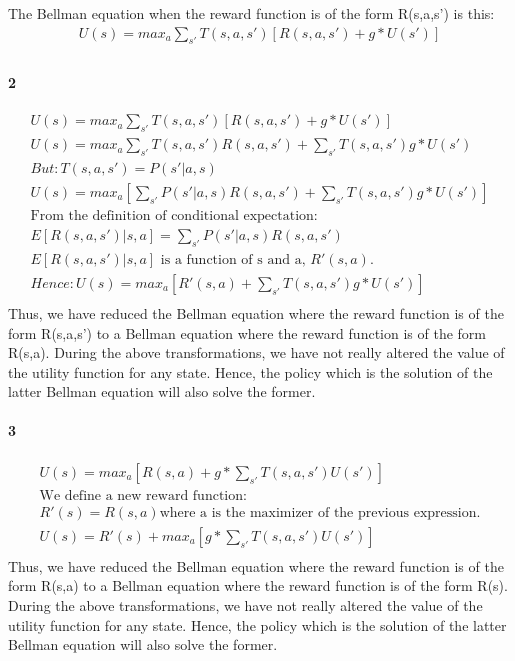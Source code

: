 \documentclass[10pt]{article}
\begin{document}
The Bellman equation when the reward function is of the form R(s,a,s') is this:
\begin{eqnarray}
U(s)=max_{a}\sum_{s'}T(s,a,s')[R(s,a,s') + g*U(s')]\\
\end{eqnarray}

\paragraph{2}
\begin{eqnarray}
U(s)=max_{a}\sum_{s'}T(s,a,s')[R(s,a,s') + g*U(s')]\\
U(s)=max_{a}\sum_{s'}T(s,a,s')R(s,a,s') + \sum_{s'}T(s,a,s')g*U(s')\\
But:T(s,a,s')=P(s'|a,s)\\
U(s)=max_{a}[\sum_{s'}P(s'|a,s)R(s,a,s') + \sum_{s'}T(s,a,s')g*U(s')]\\
\text{From the definition of conditional expectation: }\\
E[R(s,a,s')|s,a]=\sum_{s'}P(s'|a,s)R(s,a,s')\\
E[R(s,a,s')|s,a]\text{ is a function of s and a, } R'(s,a).\\
Hence: U(s)=max_{a}[R'(s,a) + \sum_{s'}T(s,a,s')g*U(s')]\\
\end{eqnarray}
Thus, we have reduced the Bellman equation where the reward function is of the form R(s,a,s') to a Bellman equation where the reward function is of the form R(s,a). During the above transformations, we have not really altered the value of the utility function for any state. Hence, the policy which is the solution of the latter Bellman equation will also solve the former.

\paragraph{3}
\begin{eqnarray}
U(s)=max_{a}[R(s,a) + g*\sum_{s'}T(s,a,s')U(s')]\\
\text{We define a new reward function: }\\
R'(s)=R(s,a) \text{where a is the maximizer of the previous expression.}\\
U(s)=R'(s)+max_{a}[g*\sum_{s'}T(s,a,s')U(s')]\\
\end{eqnarray}
Thus, we have reduced the Bellman equation where the reward function is of the form R(s,a) to a Bellman equation where the reward function is of the form R(s). During the above transformations, we have not really altered the value of the utility function for any state. Hence, the policy which is the solution of the latter Bellman equation will also solve the former.
\end{document}
